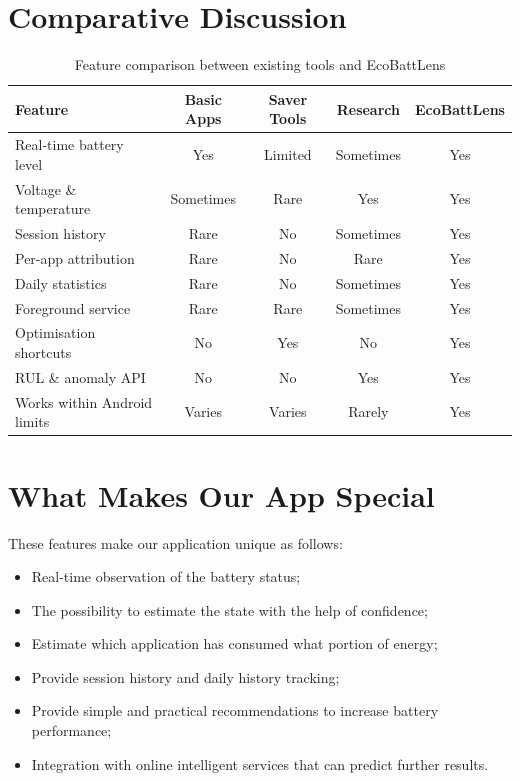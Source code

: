 \documentclass[12pt,a4paper]{report}
\begin{document}
\section{Comparative Discussion}

\begin{table}[H]
\caption{Feature comparison between existing tools and EcoBattLens}
\centering
\small
\begin{tabular}{lcccc}
\toprule
\textbf{Feature} & \textbf{Basic Apps} & \textbf{Saver Tools}
                 & \textbf{Research} & \textbf{EcoBattLens}\\
\midrule
Real-time battery level     & Yes  & Limited & Sometimes & Yes\\
Voltage \& temperature      & Sometimes & Rare  & Yes  & Yes\\
Session history             & Rare & No    & Sometimes & Yes\\
Per-app attribution         & Rare & No    & Rare  & Yes\\
Daily statistics            & Rare & No    & Sometimes & Yes\\
Foreground service          & Rare & Rare  & Sometimes & Yes\\
Optimisation shortcuts      & No   & Yes   & No    & Yes\\
RUL \& anomaly API          & No   & No    & Yes   & Yes\\
Works within Android limits & Varies & Varies & Rarely & Yes\\
\bottomrule
\end{tabular}
\end{table}

\section{What Makes Our App Special}
These features make our application unique as follows:

\begin{itemize}
    \item Real-time observation of the battery status;
    \item The possibility to estimate the state with the help of confidence;
    \item Estimate which application has consumed what portion of energy;
    \item Provide session history and daily history tracking;
    \item Provide simple and practical recommendations to increase battery performance;
    \item Integration with online intelligent services that can predict further results.
\end{itemize}
\end{document}
